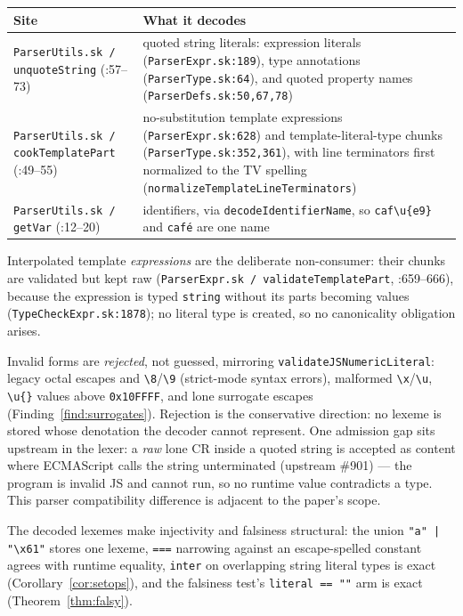 \documentclass[11pt]{article}
\begin{document}
\begin{center}
\small
\renewcommand{\arraystretch}{1.2}
\begin{tabular}{@{}p{6.4cm}p{6.8cm}@{}}
\toprule
\textbf{Site} & \textbf{What it decodes} \\
\midrule
\texttt{ParserUtils.sk / unquoteString} (:57--73) &
  quoted string literals: expression literals
  (\texttt{ParserExpr.sk:189}), type annotations
  (\texttt{ParserType.sk:64}), and quoted property names
  (\texttt{ParserDefs.sk:50,67,78}) \\
\texttt{ParserUtils.sk / cookTemplatePart} (:49--55) &
  no-substitution template expressions (\texttt{ParserExpr.sk:628}) and
  template-literal-type chunks (\texttt{ParserType.sk:352,361}), with
  line terminators first normalized to the TV spelling
  (\texttt{normalizeTemplateLineTerminators}) \\
\texttt{ParserUtils.sk / getVar} (:12--20) &
  identifiers, via \texttt{decodeIdentifierName}, so
  \texttt{caf\textbackslash u\{e9\}} and \texttt{café} are one name \\
\bottomrule
\end{tabular}
\end{center}

Interpolated template \emph{expressions} are the deliberate
non-consumer: their chunks are validated but kept raw
(\texttt{ParserExpr.sk / validateTemplatePart}, :659--666), because the
expression is typed \texttt{string} without its parts becoming values
(\texttt{TypeCheckExpr.sk:1878}); no literal type is created, so no
canonicality obligation arises.

Invalid forms are \emph{rejected}, not guessed, mirroring
\texttt{validateJSNumericLiteral}: legacy octal escapes and
\texttt{\textbackslash 8}/\texttt{\textbackslash 9} (strict-mode syntax
errors), malformed \texttt{\textbackslash x}/\texttt{\textbackslash u},
\texttt{\textbackslash u\{\}} values above \texttt{0x10FFFF}, and lone
surrogate escapes (Finding~\ref{find:surrogates}). Rejection is the
conservative direction: no lexeme is stored whose denotation the
decoder cannot represent. One admission gap sits upstream in the lexer:
a \emph{raw} lone CR inside a quoted string is accepted as content
where ECMAScript calls the string unterminated (upstream \#901) --- the
program is invalid JS and cannot run, so no runtime value contradicts a
type. This parser compatibility difference is adjacent to the paper's scope.

The decoded lexemes make injectivity and falsiness structural: the
union \texttt{"a" | "\textbackslash x61"} stores one lexeme,
\texttt{===} narrowing against an escape-spelled constant agrees with
runtime equality, \texttt{inter} on overlapping string literal types is
exact (Corollary~\ref{cor:setops}), and the falsiness test's
\texttt{literal == ""} arm is exact (Theorem~\ref{thm:falsy}).
\end{document}

